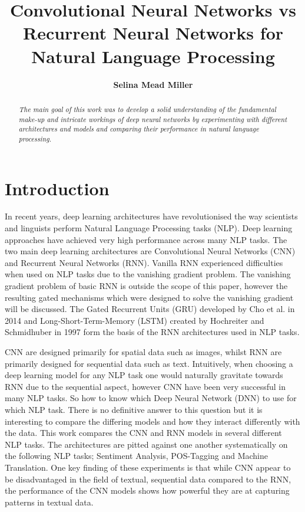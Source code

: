 \documentclass[twocolumn,12pt]{asme2ej}
\title{\textrm{\textbf{\LARGE{Convolutional Neural Networks vs Recurrent Neural Networks for Natural Language Processing}}}}
\author{\textrm{\textbf{\large{Selina Mead Miller}}}
    \affiliation{
    \textrm{\large{Tübingen Universität}}\\
	\textrm{\textit{Sequence and Structure Learning}}\\
	\textrm{WS18/19}\\
    \small{selinamead@live.com}\\
    \small{Matrikelnummer: 4065083}\\
    }	
}
\begin{document}
\maketitle  



\begin{abstract}
\begin{center}
{\it The main goal of this work was to develop a solid understanding of the fundamental make-up and intricate workings of deep neural networks by experimenting with different architectures and models and comparing their performance in natural language processing.  
}
\end{center}
\end{abstract}


\section{Introduction}

In recent years, deep learning architectures have revolutionised the way scientists and linguists perform Natural Language Processing tasks (NLP). Deep learning approaches have achieved very high performance across many NLP tasks. The two main deep learning architectures are Convolutional Neural Networks (CNN) and Recurrent Neural Networks (RNN). Vanilla RNN experienced difficulties when used on NLP tasks due to the vanishing gradient problem. The vanishing gradient problem of basic RNN is outside the scope of this paper, however the resulting gated mechanisms which were designed to solve the vanishing gradient will be discussed. The Gated Recurrent Units (GRU) developed by Cho et al. in 2014 \cite{GatedRecurrentNeuralNetworksonSequenceModeling} and Long-Short-Term-Memory (LSTM) created by Hochreiter and Schmidhuber in 1997 \cite{LongShortTermMemory} form the basis of the RNN architectures used in NLP tasks.

CNN are designed primarily for spatial data such as images, whilst RNN are primarily designed for sequential data such as text. Intuitively, when choosing a deep learning model for any NLP task one would naturally gravitate towards RNN due to the sequential aspect, however CNN have been very successful in many NLP tasks. So how to know which Deep Neural Network (DNN) to use for which NLP task. There is no definitive answer to this question but it is interesting to compare the differing models and how they interact differently with the data. 
This work compares the CNN and RNN models in several different NLP tasks. The architectures are pitted against one another systematically on the following NLP tasks; Sentiment Analysis, POS-Tagging and Machine Translation. One key finding of these experiments is that while CNN appear to be disadvantaged in the field of textual, sequential data compared to the RNN, the performance of the CNN models shows how powerful they are at capturing patterns in textual data.
\end{document}
